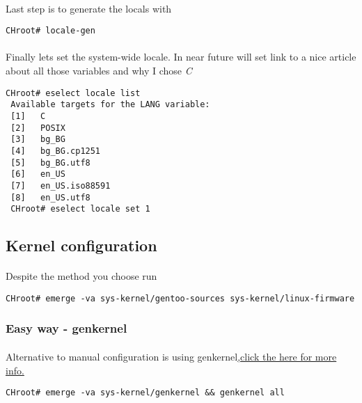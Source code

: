 \documentclass[10pt,a4paper]{article}
\begin{document}
\begin{enumerate}


                    \paragraph{} Last step is to generate the locals with

\begin{lstlisting}[style=BashInputCHRoot]
 CHroot# locale-gen
\end{lstlisting}

                    \paragraph{} Finally lets set the system-wide locale. In near future will set link to a nice article about all those variables and why I chose \textit{C}

\begin{lstlisting}[style=BashInputCHRoot]
 CHroot# eselect locale list
 Available targets for the LANG variable:
 [1]   C
 [2]   POSIX
 [3]   bg_BG
 [4]   bg_BG.cp1251
 [5]   bg_BG.utf8
 [6]   en_US
 [7]   en_US.iso88591
 [8]   en_US.utf8
 CHroot# eselect locale set 1
\end{lstlisting}

                \end{enumerate}

        \newpage
        \subsection{Kernel configuration}

            \paragraph{} Despite the method you choose run

\begin{lstlisting}[style=BashInputCHRoot]
 CHroot# emerge -va sys-kernel/gentoo-sources sys-kernel/linux-firmware
\end{lstlisting}

            \newpage
            \subsubsection{Easy way - genkernel}

                \paragraph{} Alternative to manual configuration is using genkernel\href{https://wiki.gentoo.org/wiki/Handbook:AMD64/Installation/Kernel#Alternative:_Using_genkernel}{,click the here for more info.}
\begin{lstlisting}[style=BashInputCHRoot]
 CHroot# emerge -va sys-kernel/genkernel && genkernel all
\end{lstlisting}
\end{document}
